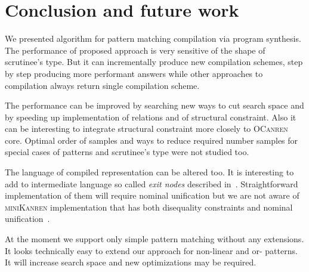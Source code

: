 \section{Conclusion and future work}

We presented algorithm for pattern matching compilation via program synthesis. The performance of proposed approach is very sensitive of the shape of scrutinee's type. 
But it can incrementally produce new compilation schemes,  step by step producing more performant answers while other approaches to compilation always return single compilation scheme.

The performance can be improved by searching new ways to cut search space and by speeding up implementation of relations and of structural constraint. Also it can be interesting to integrate structural constraint more closely to \textsc{OCanren} core. Optimal order of samples and ways to reduce required number samples for special cases of patterns and scrutinee's type were not studied too.

The language of compiled representation can be altered too. It is interesting to add to intermediate language so called \emph{exit nodes} described in~\cite{maranget2001}.
Straightforward implementation of them will require nominal unification but we are not aware of \textsc{miniKanren} implementation that has both disequality constraints and nominal unification~\cite{alphaKanren}.

At the moment we support only simple pattern matching without any extensions. It looks    technically easy to extend our approach for non-linear and or- patterns. It will increase search space and new optimizations may be required.



